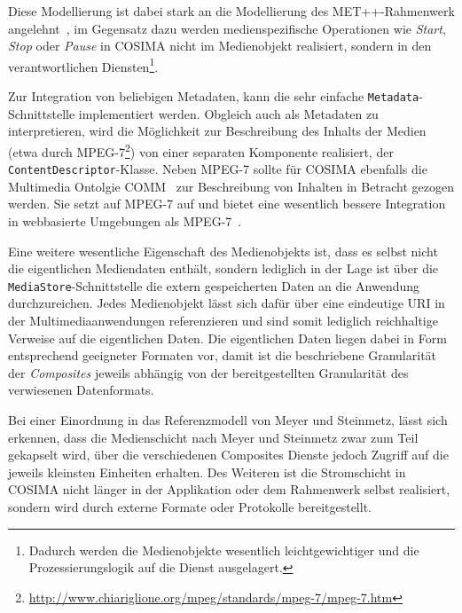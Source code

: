   Diese Modellierung ist dabei stark an die Modellierung des MET++-Rahmenwerk angelehnt~\citep[S. 75]{ackermann1996doo}, im Gegensatz dazu werden medienspezifische Operationen wie \emph{Start}, \emph{Stop} oder \emph{Pause} in COSIMA nicht im Medienobjekt realisiert, sondern in den verantwortlichen Diensten\footnote{Dadurch werden die Medienobjekte wesentlich leichtgewichtiger und die Prozessierungslogik auf die Dienst ausgelagert.}.
  
  
  Zur Integration von beliebigen Metadaten, kann die sehr einfache \verb!Metadata!-Schnittstelle implementiert werden. Obgleich auch als Metadaten zu interpretieren, wird die Möglichkeit zur Beschreibung des Inhalts der Medien (etwa durch MPEG-7\footnote{\url{http://www.chiariglione.org/mpeg/standards/mpeg-7/mpeg-7.htm}}) von einer separaten Komponente realisiert, der \verb!ContentDescriptor!-Klasse. Neben MPEG-7 sollte für COSIMA ebenfalls die Multimedia Ontolgie COMM~\citep{arndt2007cdw} zur Beschreibung von Inhalten in Betracht gezogen werden. Sie setzt auf MPEG-7 auf und bietet eine wesentlich bessere Integration in webbasierte Umgebungen als MPEG-7~\citep[S. 31]{arndt2007cdw}.
  
  Eine weitere wesentliche Eigenschaft des Medienobjekts ist, dass es selbst nicht die eigentlichen Mediendaten enthält, sondern lediglich in der Lage ist über die \verb!MediaStore!-Schnittstelle die extern gespeicherten Daten an die Anwendung durchzureichen. Jedes Medienobjekt lässt sich dafür über eine eindeutige URI in der Multimediaanwendungen referenzieren und sind somit lediglich reichhaltige Verweise auf die eigentlichen Daten. Die eigentlichen Daten liegen dabei in Form entsprechend geeigneter Formaten vor, damit ist die beschriebene Granularität der \emph{Composites} jeweils abhängig von der bereitgestellten Granularität des verwiesenen Datenformats.
  
  Bei einer Einordnung in das Referenzmodell von Meyer und Steinmetz, lässt sich erkennen, dass die Medienschicht nach Meyer und Steinmetz zwar zum Teil gekapselt wird, über die verschiedenen Composites Dienste jedoch Zugriff auf die jeweils kleinsten Einheiten erhalten. Des Weiteren ist die Stromschicht  in COSIMA nicht länger in der Applikation oder dem Rahmenwerk selbst realisiert, sondern wird durch externe Formate oder Protokolle bereitgestellt.
  
